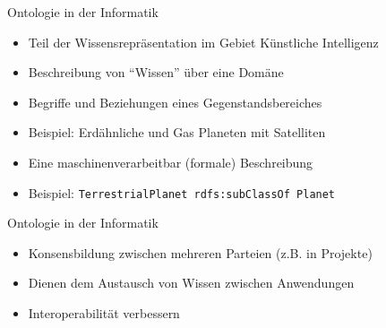 \documentclass{beamer}
\begin{document}
\begin{frame}{Ontologie in der Informatik}
	
	\begin{itemize}
		\item Teil der Wissensrepräsentation im Gebiet Künstliche Intelligenz
		\item Beschreibung von ``Wissen'' über eine Domäne
		\item Begriffe und Beziehungen eines Gegenstandsbereiches
		\item Beispiel: Erdähnliche und Gas Planeten mit Satelliten
		\item Eine maschinenverarbeitbar (formale) Beschreibung 
		\item Beispiel: \texttt{TerrestrialPlanet rdfs:subClassOf Planet}
	\end{itemize}
	
\end{frame}

\begin{frame}{Ontologie in der Informatik}
	
	\begin{itemize}
		\item Konsensbildung zwischen mehreren Parteien (z.B. in Projekte)
		\item Dienen dem Austausch von Wissen zwischen Anwendungen
		\item Interoperabilität verbessern
	\end{itemize}
	
\end{frame}
\end{document}
